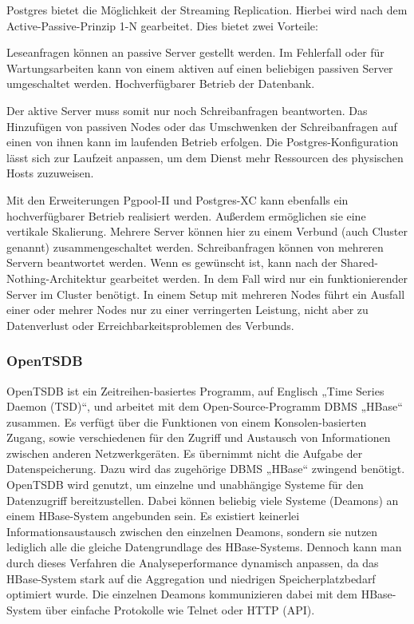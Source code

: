 Postgres bietet die Möglichkeit der \gls{Streaming Replication}. Hierbei wird
nach dem \gls{Active-Passive-Prinzip} 1\hyp{}N gearbeitet. Dies bietet zwei
Vorteile:

\begin{outline}
  \1 Leseanfragen können an passive Server gestellt werden.
  \1 Im Fehlerfall oder für Wartungsarbeiten kann von einem aktiven auf einen
  beliebigen passiven Server umgeschaltet werden.
  \1 Hochverfügbarer Betrieb der Datenbank.
\end{outline}

Der aktive Server muss somit nur noch Schreibanfragen beantworten. Das
Hinzufügen von passiven Nodes oder das Umschwenken der Schreibanfragen auf
einen von ihnen kann im laufenden Betrieb erfolgen. Die
Postgres\hyp{}Konfiguration lässt sich zur Laufzeit anpassen, um dem Dienst
mehr Ressourcen des physischen Hosts zuzuweisen.

Mit den Erweiterungen \gls{Pgpool-II} und \gls{Postgres-XC} kann ebenfalls ein
hochverfügbarer Betrieb realisiert werden. Außerdem ermöglichen sie eine
vertikale \gls{Skalierung}. Mehrere Server können hier zu einem Verbund (auch
Cluster genannt) zusammengeschaltet werden. Schreibanfragen können von mehreren
Servern beantwortet werden. Wenn es gewünscht ist, kann nach der
\gls{Shared-Nothing-Architektur} gearbeitet werden. In dem Fall wird nur ein
funktionierender Server im Cluster benötigt. In einem Setup mit mehreren Nodes
führt ein Ausfall einer oder mehrer Nodes nur zu einer verringerten Leistung,
nicht aber zu Datenverlust oder Erreichbarkeitsproblemen des Verbunds.
\tm%

\subsubsection{OpenTSDB}
\label{subsubsec:opentsdb}
OpenTSDB ist ein Zeitreihen\hyp{}basiertes Programm, auf Englisch „Time Series
Daemon (TSD)“, und arbeitet mit dem Open\hyp{}Source\hyp{}Programm \gls{DBMS}
„HBase“ zusammen. Es verfügt über die Funktionen von einem
Konsolen\hyp{}basierten Zugang, sowie verschiedenen 
für den Zugriff und Austausch von Informationen zwischen anderen
Netzwerkgeräten. Es übernimmt nicht die Aufgabe der Datenspeicherung. Dazu
wird das zugehörige \gls{DBMS} „HBase“ zwingend benötigt. OpenTSDB wird
genutzt, um einzelne und unabhängige Systeme für den Datenzugriff
bereitzustellen. Dabei können beliebig viele Systeme (Deamons) an einem
HBase\hyp{}System angebunden sein. Es existiert keinerlei Informationsaustausch
zwischen den einzelnen Deamons, sondern sie nutzen lediglich alle die gleiche
Datengrundlage des HBase\hyp{}Systems. Dennoch kann man durch dieses Verfahren
die Analyseperformance dynamisch anpassen, da das HBase\hyp{}System stark auf
die Aggregation und niedrigen Speicherplatzbedarf optimiert wurde. Die
einzelnen Deamons kommunizieren dabei mit dem HBase\hyp{}System über einfache
Protokolle wie Telnet oder \gls{HTTP} (\gls{API}).

